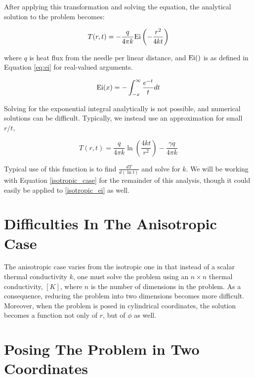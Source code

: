 After applying this transformation and solving the equation, the analytical
solution to the problem becomes:

\begin{equation}
\label{isotropic_ei}
T(r,t) = - \frac{q}{4\pi k}\textrm{Ei}\left(-\frac{r^2}{4kt}\right)
\end{equation}

where \(q\) is heat flux from the needle per linear distance, and \(\textrm{Ei}()\) is
as defined in Equation \ref{eq:ei} for real-valued arguments.

\begin{equation}
\label{eq:ei}
\textrm{Ei}(x) = -\int_{-x}^{\infty} \frac{e^{-t}}{t}dt
\end{equation}

Solving for the exponential integral analytically is not possible, and numerical
solutions can be difficult. Typically, we instead use an approximation for small
\(r/t\),

\begin{equation}
\label{isotropic_case}
T(r,t) = \frac{q}{4\pi k}\ln\left(\frac{4kt}{r^2}\right) - \frac{\gamma q}{4\pi k}
\end{equation}

Typical use of this function is to find \(\frac{dT}{d(\ln t)}\) and solve
for \(k\). We will be working with Equation \ref{isotropic_case} for the remainder of
this analysis, though it could easily be applied to \ref{isotropic_ei} as well.


\section{Difficulties In The Anisotropic Case}
\label{sec:analytical-np:anisotropic-diff}


The anisotropic case varies from the isotropic one in that instead of a scalar 
thermal conductivity \(k\), one must solve the problem using an \(n \times n\)
thermal conductivity, \([K]\), where \(n\) is the number of dimensions in the
problem. As a consequence, reducing the problem into two dimensions becomes more
difficult. Moreover, when the problem is posed in cylindrical coordinates, the
solution becomes a function not only of \(r\), but of \(\phi\) as well.

\section{Posing The Problem in Two Coordinates}
\label{sec:analytical-np:2D}


